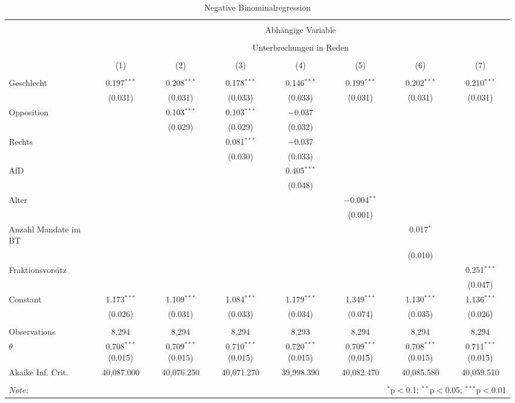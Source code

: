 
\begin{table}[!htbp] \centering 
  \caption{Negative Binominalregression} 
  \label{} 
\begin{tabular}{@{\extracolsep{5pt}}lccccccc} 
\\[-1.8ex]\hline 
\hline \\[-1.8ex] 
 & \multicolumn{7}{c}{Abhängige Variable} \\ 
\cline{2-8} 
\\[-1.8ex] & \multicolumn{7}{c}{Unterbrechungen in Reden} \\ 
\\[-1.8ex] & (1) & (2) & (3) & (4) & (5) & (6) & (7)\\ 
\hline \\[-1.8ex] 
 Geschlecht & 0.197$^{***}$ & 0.208$^{***}$ & 0.178$^{***}$ & 0.146$^{***}$ & 0.199$^{***}$ & 0.202$^{***}$ & 0.210$^{***}$ \\ 
  & (0.031) & (0.031) & (0.033) & (0.033) & (0.031) & (0.031) & (0.031) \\ 
  Opposition &  & 0.103$^{***}$ & 0.103$^{***}$ & $-$0.037 &  &  &  \\ 
  &  & (0.029) & (0.029) & (0.032) &  &  &  \\ 
  Rechts &  &  & 0.081$^{***}$ & $-$0.037 &  &  &  \\ 
  &  &  & (0.030) & (0.033) &  &  &  \\ 
  AfD &  &  &  & 0.405$^{***}$ &  &  &  \\ 
  &  &  &  & (0.048) &  &  &  \\ 
  Alter &  &  &  &  & $-$0.004$^{**}$ &  &  \\ 
  &  &  &  &  & (0.001) &  &  \\ 
  Anzahl Mandate im BT &  &  &  &  &  & 0.017$^{*}$ &  \\ 
  &  &  &  &  &  & (0.010) &  \\ 
  Fraktionsvorsitz &  &  &  &  &  &  & 0.251$^{***}$ \\ 
  &  &  &  &  &  &  & (0.047) \\ 
  Constant & 1.173$^{***}$ & 1.109$^{***}$ & 1.084$^{***}$ & 1.179$^{***}$ & 1.349$^{***}$ & 1.130$^{***}$ & 1.136$^{***}$ \\ 
  & (0.026) & (0.031) & (0.033) & (0.034) & (0.074) & (0.035) & (0.026) \\ 
 \hline \\[-1.8ex] 
Observations & 8,294 & 8,294 & 8,294 & 8,293 & 8,294 & 8,294 & 8,294 \\ 
$\theta$ & 0.708$^{***}$  (0.015) & 0.709$^{***}$  (0.015) & 0.710$^{***}$  (0.015) & 0.720$^{***}$  (0.015) & 0.709$^{***}$  (0.015) & 0.708$^{***}$  (0.015) & 0.711$^{***}$  (0.015) \\ 
Akaike Inf. Crit. & 40,087.000 & 40,076.250 & 40,071.270 & 39,998.390 & 40,082.470 & 40,085.580 & 40,059.510 \\ 
\hline 
\hline \\[-1.8ex] 
\textit{Note:}  & \multicolumn{7}{r}{$^{*}$p$<$0.1; $^{**}$p$<$0.05; $^{***}$p$<$0.01} \\ 
\end{tabular} 
\end{table} 
